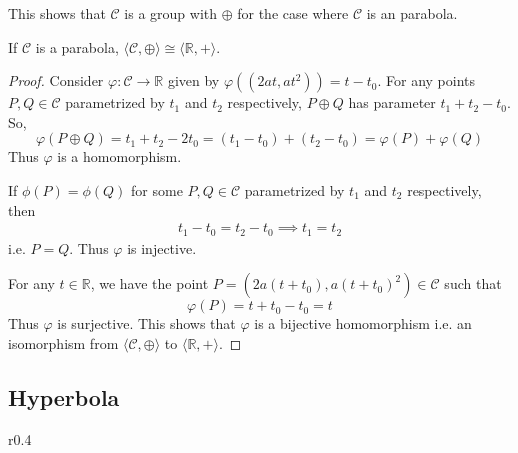 \noindent
This shows that $\mathcal{C}$ is a group with $\oplus$ for the case where $\mathcal{C}$ is an
parabola.

\begin{theorem}
    If $\mathcal{C}$ is a parabola,
    $\langle \mathcal{C},\oplus \rangle \cong \langle \mathbb{R},+ \rangle$.
\end{theorem}

\begin{proof}
    Consider $\varphi:\mathcal{C} \to \mathbb{R}$ given by
    $\varphi((2at,at^2)) = t - t_0$. For any points
    $P,Q\in\mathcal{C}$ parametrized by $t_1$ and $t_2$ respectively,
    $P \oplus Q$ has parameter $t_1 + t_2 - t_0$. So,
    \[
        \varphi(P \oplus Q) = t_1 + t_2 - 2t_0 = (t_1 - t_0) + (t_2 - t_0)
        = \varphi(P) + \varphi(Q)
    \]
    Thus $\varphi$ is a homomorphism.
    \vspace{1ex}

    \noindent
    If $\phi(P)=\phi(Q)$ for some $P,Q\in\mathcal{C}$ parametrized by $t_1$ and
    $t_2$ respectively, then
    \begin{align*}
        t_1 - t_0 = t_2 - t_0 \implies t_1 = t_2
    \end{align*}
    i.e. $P=Q$. Thus $\varphi$ is injective.
    \vspace{1ex}

    \noindent
    For any $t \in \mathbb{R}$, we have the point
    $P=(2a(t + t_0),a(t + t_0)^2) \in \mathcal{C}$ such that
    \[ \varphi(P) = t + t_0 - t_0 = t \]
    Thus $\varphi$ is surjective. This shows that $\varphi$ is a bijective
    homomorphism i.e. an isomorphism from $\langle \mathcal{C},\oplus \rangle$ to
    $\langle \mathbb{R},+ \rangle$.
\end{proof}

\subsection*{Hyperbola}

\begin{wrapfigure}{r}{0.4\textwidth}
    \centering

    \caption{}
\end{wrapfigure}

